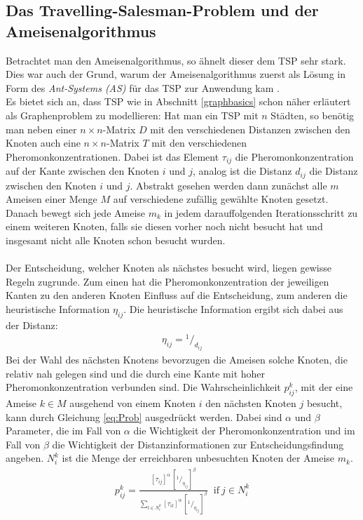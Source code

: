 \documentclass[doktyp=barbeit, sprache=german]{TUBAFarbeiten}
\newcommand*\rfrac[2]{{}^{#1}\!/_{#2}}
\begin{document}
\subsection{Das Travelling-Salesman-Problem und der Ameisenalgorithmus}
Betrachtet man den Ameisenalgorithmus, so ähnelt dieser dem TSP sehr stark. Dies war auch der Grund, warum der Ameisenalgorithmus zuerst als Lösung in Form des \textit{Ant-Systems (AS)} für das TSP zur Anwendung kam \cite{MaxMin}.
\\Es bietet sich an, dass TSP wie in Abschnitt \ref{graphbasics} schon näher erläutert als Graphenproblem zu modellieren:
Hat man ein TSP mit $n$ Städten, so benötig man neben einer $n\times n$-Matrix $D$ mit den verschiedenen Distanzen zwischen den Knoten auch eine $n\times n$-Matrix $T$ mit den verschiedenen Pheromonkonzentrationen. Dabei ist das Element $\tau_{ij}$ die Pheromonkonzentration auf der Kante zwischen den Knoten $i$ und $j$, analog ist die Distanz $d_{ij}$ die Distanz zwischen den Knoten $i$ und $j$. 
Abstrakt gesehen werden dann zunächst alle $m$ Ameisen einer Menge $M$ auf verschiedene zufällig gewählte Knoten gesetzt. Danach bewegt sich jede Ameise $m_k$ in jedem darauffolgenden Iterationsschritt zu einem weiteren Knoten, falls sie diesen vorher noch nicht besucht hat und insgesamt nicht alle Knoten schon besucht wurden. 
\\\\Der Entscheidung, welcher Knoten als nächstes besucht wird, liegen gewisse Regeln zugrunde. Zum einen hat die Pheromonkonzentration der jeweiligen Kanten zu den anderen Knoten Einfluss auf die Entscheidung, zum anderen die heuristische Information $\eta_{ij}$. Die heuristische Information ergibt sich dabei aus der Distanz:
\begin{align}
\label{eq:Heuristic}
\eta_{ij} = \rfrac{1}{d_{ij}}
\end{align}
Bei der Wahl des nächsten Knotens bevorzugen die Ameisen solche Knoten, die relativ nah gelegen sind und die durch eine Kante mit hoher Pheromonkonzentration verbunden sind.
Die Wahrscheinlichkeit $p^k_{ij}$, mit der eine Ameise $k \in M$ ausgehend von einem Knoten $i$ den nächsten Knoten $j$ besucht, kann durch Gleichung \ref{eq:Prob} ausgedrückt werden.
Dabei sind $\alpha$ und $\beta$ Parameter, die im Fall von $\alpha$ die Wichtigkeit der Pheromonkonzentration und im Fall von $\beta$ die Wichtigkeit der Distanzinformationen zur Entscheidungsfindung angeben. $N^k_i$ ist die Menge der erreichbaren unbesuchten Knoten der Ameise $m_k$.
\begin{align}
\label{eq:Prob}
p^k_{ij} = \frac{[\tau_{ij}]^\alpha \, [\rfrac{1}{\eta_{ij}}]^\beta}{\sum\nolimits_{l\in N^k_i} [\tau_{il}]^\alpha \, [\rfrac{1}{\eta_{ij}}]^\beta} \; \; \text{if}\: j \in N^k_i    
\end{align}
\end{document}
